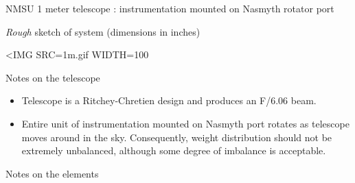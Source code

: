 \documentclass{report}[12pt]
\begin{document}
\begin{LARGE}
\begin{center}
NMSU 1 meter telescope : instrumentation mounted on Nasmyth rotator port
\end{center}
\end{LARGE}

\vskip 0.5in

\noindent \textit{Rough} sketch of system (dimensions in inches)


\begin{latexonly}
\end{latexonly}
\begin{htmlonly}
\begin{rawhtml}
<IMG SRC=1m.gif WIDTH=100%
\end{rawhtml}
\end{htmlonly}

\noindent Notes on the telescope

\begin{itemize}
\item Telescope is a Ritchey-Chretien design and produces an F/6.06 beam.

\item Entire unit of instrumentation mounted on Nasmyth port rotates as
telescope moves around in the sky. Consequently, weight distribution should 
not be extremely unbalanced, although some degree of imbalance is acceptable.

\end{itemize}

\noindent Notes on the elements
\end{document}
